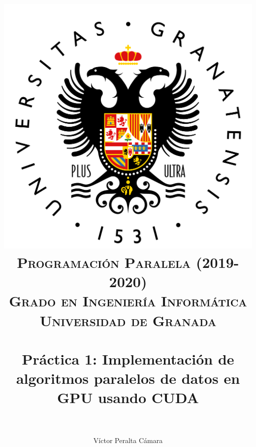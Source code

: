 
\usepackage{lmodern}

\title{	
	\includegraphics[scale=0.8]{escudoUGR}\\ %
	\normalfont \normalsize 
	\textsc{\textbf{Programación Paralela (2019-2020)} \\ Grado en Ingeniería Informática \\ Universidad de Granada} \\ [30pt] %
	\horrule{0.5pt} \\[0.4cm] %
	\huge Práctica 1:
	Implementación de algoritmos paralelos
	de datos en GPU usando CUDA\\ %
	\horrule{2pt} \\[0.5cm] %
}  

\author{
	Víctor Peralta Cámara\\
}


